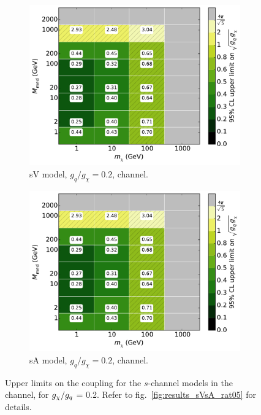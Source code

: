 \begin{figure}
  \centering
  \begin{subfigure}[t]{0.495\textwidth}
    \centering
    \includegraphics[width=1.\textwidth]{figures/grid_basepoints_SVD_rat02_monojet.pdf}
    \caption{sV model, $g_q/g_{\chi} = 0.2$, \monojet channel.}
  \end{subfigure}
  \begin{subfigure}[t]{0.495\textwidth}
    \centering
    \includegraphics[width=1.\textwidth]{figures/grid_basepoints_SVD_rat02_monojet.pdf} %
    \caption{sA model, $g_q/g_{\chi} = 0.2$, \monojet channel.}
  \end{subfigure}
  \caption{Upper limits on the coupling for the $s$-channel models in the \monojet channel, for $g_{\chi} / g_q$ = 0.2. Refer to fig.~\ref{fig:results_sVsA_rat05} for details.}
  \label{fig:results_sVsA_rat02}
\end{figure}

